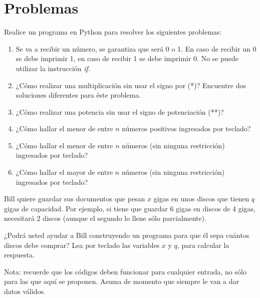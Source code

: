 \section{Problemas}

\begin{Exercise}[title={Calentamiento}]
Realice un programa en Python para resolver los siguientes problemas:
\begin{enumerate}
\item Se va a recibir un número, se garantiza que será 0 o 1. En caso de recibir un 0 se debe imprimir 1, en caso de recibir 1 se debe imprimir 0. No se puede utilizar la instrucción \emph{if}.

\item ¿Cómo realizar una multiplicación sin usar el signo por (*)? Encuentre dos soluciones diferentes para éste problema.

\item ¿Cómo realizar una potencia sin usar el signo de potenciación (**)?

\item ¿Cómo hallar el menor de entre $n$ números positivos ingresados por teclado?

\item ¿Cómo hallar el menor de entre $n$ números (sin ninguna restricción)  ingresados por teclado?

\item ¿Cómo hallar el mayor de entre $n$ números (sin ninguna restricción)  ingresados por teclado?
\end{enumerate}
\end{Exercise}
\begin{Answer}


\end{Answer}

\begin{Exercise}[title={La Copia de Seguridad}]
Bill quiere guardar sus documentos que pesan $x$ gigas en unos discos que tienen $q$ gigas de capacidad. Por ejemplo, si tiene que guardar 6 gigas en discos de 4 gigas, necesitará 2 discos (aunque el segundo lo llene sólo parcialmente).

¿Podrá usted ayudar a Bill construyendo un programa para que él sepa cuántos discos debe comprar? Lea por teclado las variables $x$ y $q$, para calcular la respuesta.

Nota: recuerde que los códigos deben funcionar para cualquier entrada, no sólo para las que aquí se proponen. Asuma de momento que siempre le van a dar datos válidos.

\end{Exercise}

